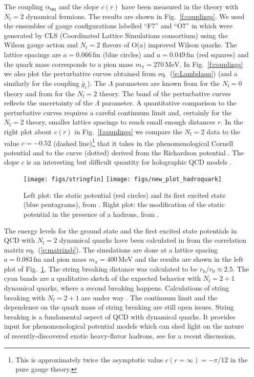 \documentclass{PoS}
\newcommand{\eq}[1]{eq.~(\ref{#1})}
\newcommand{\fig}[1]{Fig.~\ref{#1}}
\def\nf{N_{\mathrm{f}}}
\def\rb{r_{\mathrm{b}}}
\def\aqq{\alpha_{\rm qq}}
\def\gc{\bar{g}_\mathrm{c}}
\begin{document}
The coupling $\aqq$ and the slope $c(r)$ have been measured in the theory
with $\nf=2$ dynamical fermions. The results are shown in \fig{f:couplings}.
We used the ensembles of gauge configurations
labelled ``F7'' and ``O7'' in \cite{Fritzsch:2012wq} which were
generated by CLS (Coordinated Lattice Simulations consortium) using the Wilson 
gauge action and $\nf=2$ flavors of O($a$) improved Wilson quarks. The
lattice spacings are $a=0.066\,\mathrm{fm}$ (blue circles) and 
$a=0.049\,\mathrm{fm}$ (red squares) and the quark mass corresponds to
a pion mass $m_\pi=270\,\mathrm{MeV}$.
In \fig{f:couplings} we also plot the perturbative curves obtained 
from \eq{e:Lambdaqq} (and a similarly for the coupling $\gc$).
The $\Lambda$ parameters are known from \cite{Capitani:1998mq} for the
$\nf=0$ theory and from \cite{Fritzsch:2012wq} for the $\nf=2$ theory.
The band of the perturbative curves reflects the
uncertainty of the $\Lambda$ parameter.
A quantitative comparison to the perturbative curves requires
a careful continuum limit and, certainly for the $\nf=2$ theory,
smaller lattice spacings to reach small enough distances $r$.
In the right plot about $c(r)$ in \fig{f:couplings} we compare the
$\nf=2$ data to the value $c=-0.52$ 
 (dashed line)\footnote{
This is approximately twice the asymptotic value $c(r=\infty)=-\pi/12$
in the pure gauge theory.} that it takes in the
phenomenological Cornell potential \cite{Eichten:1979ms} and to
the curve (dotted) derived from the Richardson potential
\cite{Richardson:1978bt}.
The slope $c$ is an interesting but difficult quantity for holographic QCD models \cite{Giataganas:2011nz}.
%
\begin{figure}[t]\centering
\texttt{[image: figs/stringfin]}
\hspace{0.1cm}
\texttt{[image: figs/new\_plot\_hadroquark]}
\caption{Left plot: the static potential (red circles) and its first excited state (blue pentagrams), from \cite{Bali:2005fu}. Right plot: the modification of the static potential in the presence of a hadrons, from \cite{Alberti:2016dru}.}
  \label{f:sb_hadroquark}
\end{figure}
%

The energy levels for the ground state and the first excited state potentials
in QCD with $\nf=2$ dynamical quarks have been calculated in \cite{Bali:2005fu}
from the correlation matrix \eq{e:matrixsb}.
The simulations are done at a lattice spacing $a=0.083\,\mathrm{fm}$ and pion
mass $m_\pi=400\,\mathrm{MeV}$ and the results are shown in the left plot
of \fig{f:sb_hadroquark}. The string breaking distance was calculated to be
$\rb/r_0\approx2.5$. The cyan bands are a qualitative sketch of the expected 
behavior with $\nf=2+1$ dynamical quarks, where a second breaking happens. 
Calculations of string breaking with $\nf=2+1$ are under way \cite{Koch:2015qxr}. The continuum limit and the dependence on the quark mass of string breaking
are still open issues.
String breaking is a fundamental aspect of QCD with dynamical quarks. It 
  provides input for phenomenological potential models which can shed light 
  on the nature of recently-discovered exotic heavy-flavor hadrons, see
\cite{Oncala:2017hop} for a recent discussion.
\end{document}
